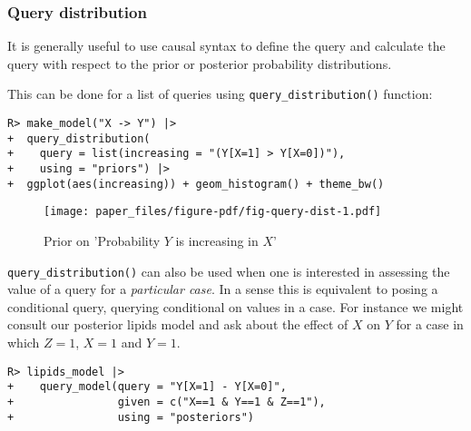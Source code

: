 \documentclass[
  11pt,
  article]{jss}
\begin{document}
\FloatBarrier

\hypertarget{query-distribution}{%
\subsubsection{Query distribution}\label{query-distribution}}

It is generally useful to use causal syntax to define the query and
calculate the query with respect to the prior or posterior probability
distributions.

This can be done for a list of queries using
\texttt{query\_distribution()} function:

\begin{verbatim}
R> make_model("X -> Y") |> 
+  query_distribution(
+    query = list(increasing = "(Y[X=1] > Y[X=0])"), 
+    using = "priors") |>
+  ggplot(aes(increasing)) + geom_histogram() + theme_bw()
\end{verbatim}

\begin{figure}[t]

{\centering \texttt{[image: paper\_files/figure-pdf/fig-query-dist-1.pdf]}

}

\caption{\label{fig-query-dist}Prior on 'Probability \(Y\) is increasing
in \(X\)'}

\end{figure}

\texttt{query\_distribution()} can also be used when one is interested
in assessing the value of a query for a \emph{particular case}. In a
sense this is equivalent to posing a conditional query, querying
conditional on values in a case. For instance we might consult our
posterior lipids model and ask about the effect of \(X\) on \(Y\) for a
case in which \(Z=1\), \(X=1\) and \(Y=1\).

\begin{verbatim}
R> lipids_model |>
+    query_model(query = "Y[X=1] - Y[X=0]",
+                given = c("X==1 & Y==1 & Z==1"),
+                using = "posteriors")
\end{verbatim}

\hypertarget{tbl-case-level-query}{}
\begin{table}[!h]
\caption{\label{tbl-case-level-query}Case Level Query Example. }\tabularnewline

\centering
{}
\end{table}
\end{document}
